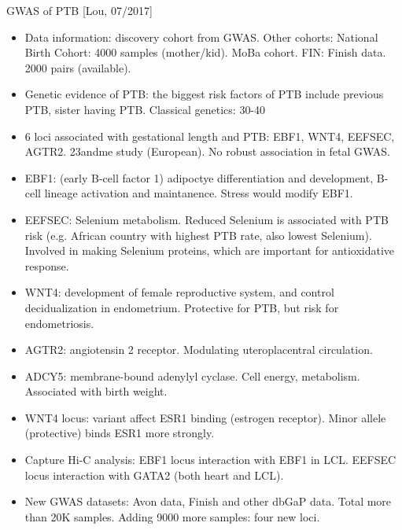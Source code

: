 \documentclass{report}
\begin{document}
GWAS of PTB [Lou, 07/2017]
\begin{itemize}
	
	\item Data information: discovery cohort from GWAS. Other cohorts: National Birth Cohort: 4000 samples (mother/kid). MoBa cohort. FIN: Finish data. 2000 pairs (available).
	
	\item Genetic evidence of PTB: the biggest risk factors of PTB include previous PTB, sister having PTB. Classical genetics: 30-40%
	
	\item 6 loci associated with gestational length and PTB: EBF1, WNT4, EEFSEC, AGTR2. 23andme study (European). No robust association in fetal GWAS.
	
	\item EBF1: (early B-cell factor 1) adipoctye differentiation and development, B-cell lineage activation and maintanence. Stress would modify EBF1.
	
	\item EEFSEC: Selenium metabolism. Reduced Selenium is associated with PTB risk (e.g. African country with highest PTB rate, also lowest Selenium). Involved in making Selenium proteins, which are important for antioxidative response.
	
	\item WNT4: development of female reproductive system, and control decidualization in endometrium. Protective for PTB, but risk for endometriosis.
	
	\item AGTR2: angiotensin 2 receptor. Modulating uteroplacentral circulation.
	
	\item ADCY5: membrane-bound adenylyl cyclase. Cell energy, metabolism. Associated with birth weight.
	
	\item WNT4 locus: variant affect ESR1 binding (estrogen receptor). Minor allele (protective) binds ESR1 more strongly.
	
	\item Capture Hi-C analysis: EBF1 locus interaction with EBF1 in LCL. EEFSEC locus interaction with GATA2 (both heart and LCL).
	
	\item New GWAS datasets: Avon data, Finish and other dbGaP data. Total more than 20K samples. Adding 9000 more samples: four new loci.
	

\end{itemize}
\end{document}
